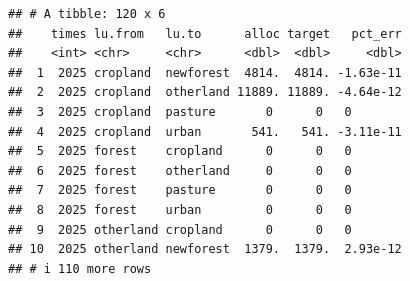 \documentclass[
]{article}
\begin{document}
\begin{verbatim}
## # A tibble: 120 x 6
##    times lu.from   lu.to      alloc target   pct_err
##    <int> <chr>     <chr>      <dbl>  <dbl>     <dbl>
##  1  2025 cropland  newforest  4814.  4814. -1.63e-11
##  2  2025 cropland  otherland 11889. 11889. -4.64e-12
##  3  2025 cropland  pasture       0      0   0       
##  4  2025 cropland  urban       541.   541. -3.11e-11
##  5  2025 forest    cropland      0      0   0       
##  6  2025 forest    otherland     0      0   0       
##  7  2025 forest    pasture       0      0   0       
##  8  2025 forest    urban         0      0   0       
##  9  2025 otherland cropland      0      0   0       
## 10  2025 otherland newforest  1379.  1379.  2.93e-12
## # i 110 more rows
\end{verbatim}
\end{document}
